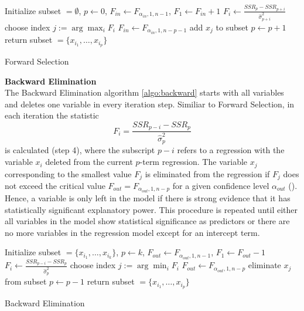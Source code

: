 \documentclass[a4paper, 11pt]{scrreprt}
\begin{document}
\begin{algorithm} 
	
	Initialize subset $= \emptyset$, $p \gets 0$, $F_{in} \gets F_{\alpha_{in},1,n-1} $, $F_1 \gets F_{in} +1$\;
	{
		{
			$F_i \gets \frac{SSR_p - SSR_{p+i}}{\hat{\sigma}_{p+i}^2}$\;
		}
		choose index $j := \arg\max_i F_i$\;
		$F_{in} \gets F_{\alpha_{in},1,n-p-1}$\;
		{
			add $x_j$ to subset\;
			$p \gets p+1$\;
		}
	}
	return subset $= \{ x_{i_1}, \ldots, x_{i_p} \}$
	\caption{Forward Selection}
	\label{algo:forward}
\end{algorithm}

\bigskip 
\textbf{Backward Elimination} \\
The Backward Elimination algorithm \ref{algo:backward} starts with all variables and deletes one variable in every iteration step. Similiar to Forward Selection, in each iteration the statistic
\begin{equation}
F_i = \frac{SSR_{p-i} - SSR_p}{\hat{\sigma}_{p}^2}
\end{equation}
is calculated (step 4), where the subscript $p-i$ refers to a regression with the variable $x_i$ deleted from the current $p$-term regression. 
The variable $x_j$ corresponding to the smallest value $F_j$ is eliminated from the regression if $F_j$ does not exceed the critical value $F_{out} = F_{\alpha_{out},1,n-p}$ for a given confidence level $\alpha_{out}$
(\textcite[chapter 4.6]{hocking1976biometrics}).
Hence, a variable is only left in the model if there is strong evidence that it has statistically significant explanatory power. 
This procedure is repeated until either all variables in the model show statistical significance as predictors or there are no more variables in the regression model except for an intercept term.

\begin{algorithm}
	
	Initialize subset $= \{ x_{i_1},\ldots, x_{i_k} \}$, $p \gets k$, $F_{out} \gets F_{\alpha_{out},1,n-1}$, $F_1 \gets F_{out} -1$\;
	{
		{
			$F_i \gets \frac{SSR_{p-i} - SSR_p}{\hat{\sigma}_{p}^2}$\;
		}
		choose index $j := \arg\min_i F_i$\;
		$F_{out} \gets F_{\alpha_{out},1,n-p}$\;
		{
			eliminate $x_j$ from subset\;
			$p \gets p-1$\;
		}
	}
	return subset $= \{ x_{i_1}, \ldots, x_{i_p} \}$
	\caption{Backward Elimination}
	\label{algo:backward}
\end{algorithm}
\end{document}
